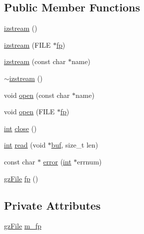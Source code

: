 \subsection*{Public Member Functions}
\begin{DoxyCompactItemize}
\item 
\mbox{\hyperlink{classizstream_a87441c80bae3b9237d66f586e396d996}{izstream}} ()
\item 
\mbox{\hyperlink{classizstream_a9f958c2eef83729ec6dda0b800e48273}{izstream}} (F\+I\+LE $\ast$\mbox{\hyperlink{classizstream_a0438da66cc9cdb1a2a7ab4872a909fbf}{fp}})
\item 
\mbox{\hyperlink{classizstream_a30fb60b38cda7232e23b199c00e72412}{izstream}} (const char $\ast$name)
\item 
\mbox{\hyperlink{classizstream_a55310a1de984e596df7b4236193ea1c3}{$\sim$izstream}} ()
\item 
void \mbox{\hyperlink{classizstream_a3e0af69bbc4704daa637850817b77098}{open}} (const char $\ast$name)
\item 
void \mbox{\hyperlink{classizstream_a1ddcaff781f58a08576f0935be5ccd3c}{open}} (F\+I\+LE $\ast$\mbox{\hyperlink{classizstream_a0438da66cc9cdb1a2a7ab4872a909fbf}{fp}})
\item 
\mbox{\hyperlink{ioapi_8h_a787fa3cf048117ba7123753c1e74fcd6}{int}} \mbox{\hyperlink{classizstream_ac2a7342deb79761277e846c8b24ef92a}{close}} ()
\item 
\mbox{\hyperlink{ioapi_8h_a787fa3cf048117ba7123753c1e74fcd6}{int}} \mbox{\hyperlink{classizstream_a6e280a19c4a745ab4acc9615788ffa95}{read}} (void $\ast$\mbox{\hyperlink{ioapi_8h_a8ad8a13c88886b9f623034ff88570adb}{buf}}, size\+\_\+t len)
\item 
const char $\ast$ \mbox{\hyperlink{classizstream_a19ca9a17f897366d081aae3950f7946e}{error}} (\mbox{\hyperlink{ioapi_8h_a787fa3cf048117ba7123753c1e74fcd6}{int}} $\ast$errnum)
\item 
\mbox{\hyperlink{zlib_8h_a8e80bd9e2c359bc5bdabb2e97b4e62bf}{gz\+File}} \mbox{\hyperlink{classizstream_a0438da66cc9cdb1a2a7ab4872a909fbf}{fp}} ()
\end{DoxyCompactItemize}
\subsection*{Private Attributes}
\begin{DoxyCompactItemize}
\item 
\mbox{\hyperlink{zlib_8h_a8e80bd9e2c359bc5bdabb2e97b4e62bf}{gz\+File}} \mbox{\hyperlink{classizstream_a44b610d38c1a46f5b4745dfdef4752d9}{m\+\_\+fp}}
\end{DoxyCompactItemize}


